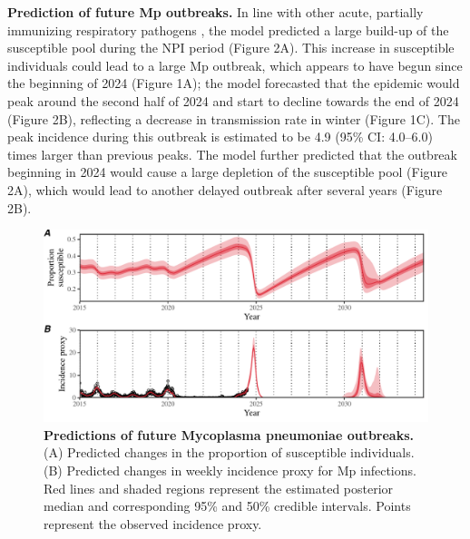 \documentclass[12pt]{article}
\begin{document}
\textbf{Prediction of future Mp outbreaks.}
In line with other acute, partially immunizing respiratory pathogens \citep{baker2020impact}, the model predicted a large build-up of the susceptible pool during the NPI period (Figure 2A).
This increase in susceptible individuals could lead to a large Mp outbreak, which appears to have begun since the beginning of 2024 (Figure 1A);
the model forecasted that the epidemic would peak around the second half of 2024 and start to decline towards the end of 2024 (Figure 2B), reflecting a decrease in transmission rate in winter (Figure 1C).
The peak incidence during this outbreak is estimated to be 4.9 (95\% CI: 4.0--6.0) times larger than previous peaks.
The model further predicted that the outbreak beginning in 2024 would cause a large depletion of the susceptible pool (Figure 2A), which would lead to another delayed outbreak after several years (Figure 2B).

\begin{figure}[!th]
\includegraphics[width=\textwidth]{../figure2/figure2_new.pdf}
\caption{
\textbf{Predictions of future Mycoplasma pneumoniae outbreaks.}
(A) Predicted changes in the proportion of susceptible individuals.
(B) Predicted changes in weekly incidence proxy for Mp infections.
Red lines and shaded regions represent the estimated posterior median and corresponding 95\% and 50\% credible intervals.
Points represent the observed incidence proxy.
}
\end{figure}
\end{document}
